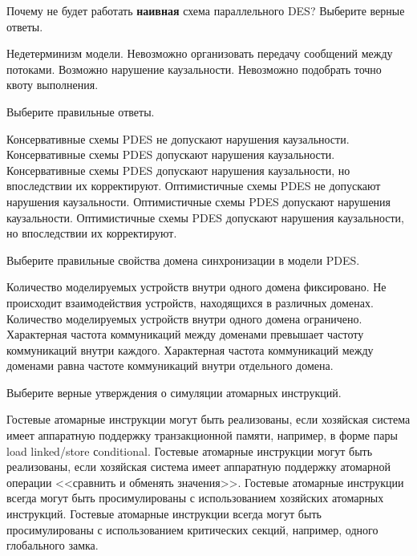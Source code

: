 \begin{questions}

\question[3] Почему не будет работать \textbf{наивная} схема параллельного DES? Выберите верные ответы.
\begin{choices}
    \correctchoice Недетерминизм модели.
    \choice Невозможно организовать передачу сообщений между потоками.
    \correctchoice Возможно нарушение каузальности.
    \choice Невозможно подобрать точно квоту выполнения.
\end{choices}


\question[3] Выберите правильные ответы.
\begin{choices}
    \correctchoice Консервативные схемы PDES не допускают нарушения каузальности.
    \choice Консервативные схемы PDES допускают нарушения каузальности.
    \choice Консервативные схемы PDES допускают нарушения каузальности, но впоследствии их корректируют.
    \choice Оптимистичные схемы PDES не допускают нарушения каузальности.
    \choice Оптимистичные схемы PDES допускают нарушения каузальности.
    \correctchoice Оптимистичные схемы PDES допускают нарушения каузальности, но впоследствии их корректируют.
\end{choices}

\question[3] Выберите правильные свойства домена синхронизации в модели PDES.
\begin{choices}
    \choice Количество моделируемых устройств внутри одного домена фиксировано.
    \choice Не происходит взаимодействия устройств, находящихся в различных доменах.
    \choice Количество моделируемых устройств внутри одного домена ограничено.
    \correctchoice Характерная частота коммуникаций  между доменами превышает частоту коммуникаций внутри каждого.
    \choice Характерная частота коммуникаций  между доменами равна частоте коммуникаций внутри отдельного домена.
\end{choices}

\question[3] Выберите верные утверждения о симуляции атомарных инструкций.
\begin{choices}
    \correctchoice Гостевые атомарные инструкции могут быть реализованы, если хозяйская система имеет аппаратную поддержку транзакционной памяти, например, в форме пары load linked/store сonditional.
    \correctchoice Гостевые атомарные инструкции могут быть реализованы, если хозяйская система имеет аппаратную поддержку  атомарной операции <<сравнить и обменять значения>>.
    \choice Гостевые атомарные инструкции всегда могут быть просимулированы с использованием хозяйских атомарных инструкций.
    \choice Гостевые атомарные инструкции всегда могут быть просимулированы с использованием критических секций, например, одного глобального замка.
\end{choices}


\end{questions}
